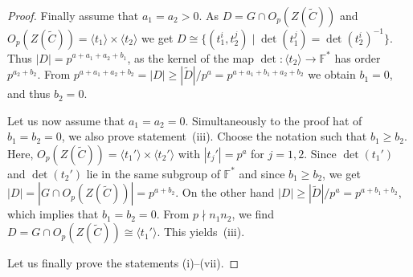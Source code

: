 \documentclass[12pt]{amsart}
\theoremstyle{theorem}
\theoremstyle{definition}
\theoremstyle{remark}
\begin{document}
\begin{proof}
Finally assume that $a_1 = a_2 > 0$. As $D = G \cap O_p( Z ( \tilde{C} ) )$ and 
$O_p( Z ( \tilde{C} ) ) = \langle t_1 \rangle \times \langle t_2 \rangle$ we get
$D \cong \{ (t_1^i, t_2^j) \mid \det( t_1^j ) = \det( t_2^i )^{-1} \}$.
Thus $|D| = p^{a + a_1 + a_2 + b_1}$, as the kernel of the map
$\det \colon \langle t_2 \rangle \rightarrow \mathbb{F}^*$ has order
$p^{a_2 + b_2}$. From $p^{a + a_1 + a_2 + b_2} = |D| \geq |\tilde{D}|/p^a =
p^{a + a_1 + b_1 + a_2 + b_2}$ we obtain $b_1 = 0$, and thus $b_2 = 0$.

Let us now assume that $a_1 = a_ 2 = 0$. Simultaneously to the proof
hat of $b_1 = b_2 = 0$, we also prove statement~(iii).
Choose the notation such that $b_1 \geq b_2$. Here, $O_p( Z ( \tilde{C} ) ) = 
\langle t_1' \rangle \times \langle t_2' \rangle$ with $|t_j'| = p^a$ for 
$j = 1, 2$. Since $\det( t_1' )$ and $\det( t_2' )$ lie in the same subgroup of 
$\mathbb{F}^*$ and since $b_1 \geq b_2$, we get 
$|D| = |G \cap O_p( Z ( \tilde{C} ) )| = p^{a+b_2}$. On the other hand 
$|D| \geq |\tilde{D}|/p^a = p^{a+b_1+b_2}$, which implies that $b_1 = b_2 = 0$.
From $p \nmid n_1n_2$, we find $D = G \cap O_p( Z( \tilde{C} ) ) \cong
\langle t_1' \rangle$. This yields~(iii).

Let us finally prove the statements (i)--(vii).


\end{proof}
\end{document}

